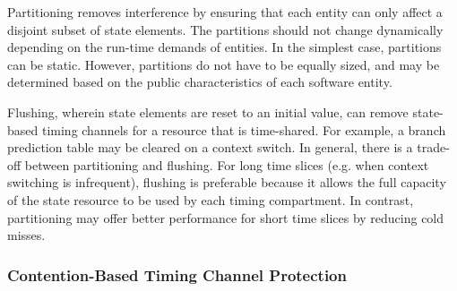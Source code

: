 Partitioning removes interference by ensuring that each entity can
only affect a disjoint subset of state elements. The partitions
should not change dynamically depending on the run-time demands of entities.
In the simplest case, partitions can be static.
However, partitions do not have to be equally sized, and may be determined 
based on the public characteristics
of each software entity.


Flushing, wherein state elements are reset to an initial value,
can remove state-based timing channels for a resource that is time-shared.
For example, a branch prediction table may be cleared on a context switch.
In general, there is a trade-off between partitioning and flushing.
For long time slices (e.g. when context switching is infrequent), flushing is 
preferable because it allows the full capacity of the state resource to be used by
each timing compartment. In contrast, partitioning may
offer better performance for short time slices by reducing cold misses.

\subsubsection{Contention-Based Timing Channel Protection}

